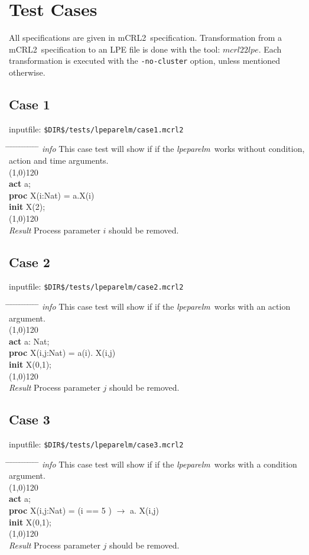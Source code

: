 \documentclass[a4paper,10pt]{article}
\theoremstyle{plain}
\theoremstyle{definition}
\newcommand{\mcrl}{mCRL2}
\newcommand{\tool}{\textit{lpeparelm}}
\newcommand{\ti}{\textit}
\newcommand{\tb}{\textbf}
\newcommand{\tabw}{\hspace*{15.mm} \= \hspace*{20.mm} \= \hspace*{5.mm} \= \hspace*{5.mm} \= \hspace*{5.mm} \= \hspace*{5.mm}  \= \hspace*{5.mm}  \= \hspace*{5.mm}  \= \hspace*{5.mm} \= \hspace*{5.mm} \= \hspace*{5.mm}  \= \hspace*{5.mm}  \= \hspace*{5.mm}\kill}
\begin{document}
\newpage
\section{Test Cases}
All specifications are given in \mcrl\ specification.
Transformation from a \mcrl\ specification to an LPE file is done with the tool:
$mcrl22lpe$. Each transformation is executed with the \verb"-no-cluster" option, unless
mentioned otherwise.

\subsection*{Case 1}
inputfile: \verb"$DIR$/tests/lpeparelm/case1.mcrl2"
\begin{tabbing}
\tabw
\ti{info} \> This case test will show if if the \tool\ works without condition, action and time arguments.\\
\line(1,0){120}\\
\tb{act} \> a; \\
\tb{proc} \> X(i:Nat) = \> a.X(i)\\
\tb{init} \> X(2); \\  
\line(1,0){120}\\
\ti{Result} \> Process parameter $i$ should be removed.\\ 
\end{tabbing}

\subsection*{Case 2}
inputfile: \verb"$DIR$/tests/lpeparelm/case2.mcrl2"
\begin{tabbing}
\tabw
\ti{info} \> This case test will show if if the \tool\ works with an action argument.\\
\line(1,0){120}\\
\tb{act} \> a: Nat; \\
\tb{proc} \> X(i,j:Nat) = \> a(i). X(i,j)\\
\tb{init} \> X(0,1); \\  
\line(1,0){120}\\
\ti{Result} \> Process parameter $j$ should be removed.\\ 
\end{tabbing}

\subsection*{Case 3}
inputfile: \verb"$DIR$/tests/lpeparelm/case3.mcrl2"
\begin{tabbing}
\tabw
\ti{info} \> This case test will show if if the \tool\ works with a condition argument.\\
\line(1,0){120}\\
\tb{act} \> a; \\
\tb{proc} \> X(i,j:Nat) = \> (i == 5 ) $\rightarrow$ a. X(i,j)\\
\tb{init} \> X(0,1); \\  
\line(1,0){120}\\
\ti{Result} \> Process parameter $j$ should be removed.\\ 
\end{tabbing}
\end{document}
